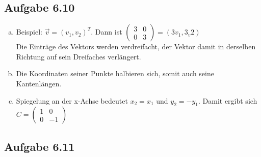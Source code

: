 \documentclass{standalone}
\begin{document}
\subsection{Aufgabe 6.10}
\begin{enumerate}[a)]
    \item Beispiel: $\vec{v} = (v_1, v_2)^T$. Dann ist $\begin{pmatrix}
        3 & 0 \\
        0 & 3
    \end{pmatrix}
    = (3v_1, 3_v2)$\\
    Die Einträge des Vektors werden verdreifacht, der Vektor damit in derselben Richtung auf sein Dreifaches verlängert.
    \item Die Koordinaten seiner Punkte halbieren sich, somit auch seine Kantenlängen.
    \item Spiegelung an der x-Achse bedeutet $x_2 = x_1$ und $y_2 = -y_1$. Damit ergibt sich $C = \begin{pmatrix}
        1 & 0 \\
        0 & -1
    \end{pmatrix}$
\end{enumerate}

\subsection{Aufgabe 6.11}
\end{document}
